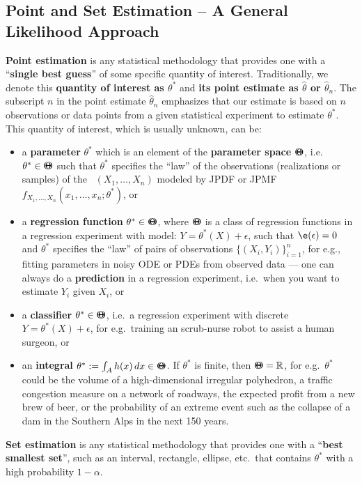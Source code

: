 \subsection{Point and Set Estimation -- A General Likelihood Approach}\label{S:PointSetEstimationLikelihood}
{\bf Point estimation} is any statistical methodology that provides one with a ``{\bf single best guess}'' of some specific quantity of interest.  Traditionally, we denote this {\bf quantity of interest as $\theta^*$} and {\bf its point estimate as $\widehat{\theta}$ or $\widehat{\theta}_n$}.  The subscript $n$ in the point estimate $\widehat{\theta}_n$ emphasizes that our estimate is based on $n$ observations or data points from a given statistical experiment to estimate $\theta^*$.  This quantity of interest, which is usually unknown, can be: %
\begin{itemize}
\item a {\bf parameter} $\theta^*$ which is an element of the {\bf parameter space} ${\Theta}\mspace{-11 mu}{\Theta}$, i.e.~$\theta^* \in {\Theta}\mspace{-11 mu}{\Theta}$ such that $\theta^*$ specifies the ``law'' of the observations (realizations or samples) of the \rv~$(X_1,\ldots,X_n)$ modeled by JPDF or JPMF $f_{X_1,\ldots,X_n}(x_1,\ldots,x_n; \theta^*)$, or
\item a {\bf regression function} $\theta^* \in {\Theta}\mspace{-11 mu}{\Theta}$, where ${\Theta}\mspace{-11 mu}{\Theta}$ is a class of regression functions in a regression experiment with model: $Y=\theta^*(X)+\epsilon$, such that $\e(\epsilon)=0$ and $\theta^*$ specifies the ``law'' of pairs of observations $\{(X_i,Y_i)\}_{i=1}^n$, for e.g., fitting parameters in noisy ODE or PDEs from observed data --- one can always do a {\bf prediction} in a regression experiment, i.e.~when you want to estimate $Y_i$ given $X_i$, or
\item a {\bf classifier} $\theta^* \in {\Theta}\mspace{-11 mu}{\Theta}$, i.e.~a regression experiment with discrete $Y = \theta^*(X)+\epsilon$, for e.g.~training an scrub-nurse robot to assist a human surgeon, or 
\item an {\bf integral} $\theta^* := \int_A h(x)\,dx \in {\Theta}\mspace{-11 mu}{\Theta}$.  If $\theta^*$ is finite, then ${\Theta}\mspace{-11 mu}{\Theta} =  \mathbb{R}$, for e.g.~$\theta^*$ could be the volume of a high-dimensional irregular polyhedron, a traffic congestion measure on a network of roadways, the expected profit from a new brew of beer, or the probability of an extreme event such as the collapse of a dam in the Southern Alps in the next 150 years.%
\end{itemize}
{\bf Set estimation} is any statistical methodology that provides one with a ``{\bf best smallest set}'', such as an interval, rectangle, ellipse, etc.~that contains $\theta^*$ with a high probability $1-\alpha$.

